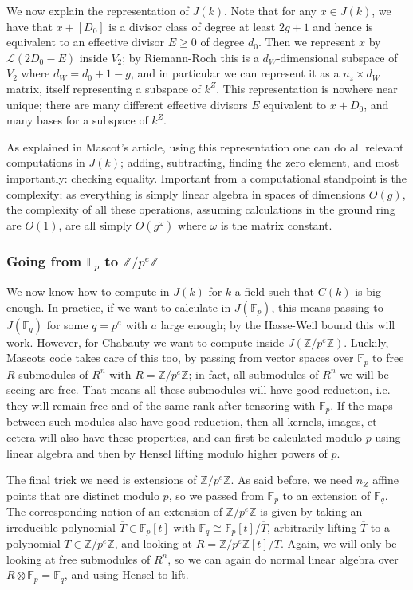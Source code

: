 \documentclass[12pt]{article}
\newcommand{\Z}{\mathbb{Z}}
\newcommand{\Lcal}{\mathcal{L}}
\newcommand{\F}{\mathbb{F}}
\newcommand{\tensor}{\otimes}
\theoremstyle{plain}
\theoremstyle{definition}
\theoremstyle{remark}
\begin{document}
We now explain the representation of $J(k)$. Note that for any $x \in J(k)$, we have that $x + [D_0]$ is a divisor class of degree at least $2g+1$ and hence is equivalent to an effective divisor $E \geq 0$ of degree $d_0$. Then we represent $x$ by $\Lcal(2D_0 - E)$ inside $V_2$; by Riemann-Roch this is a $d_W$-dimensional subspace of $V_2$ where $d_W = d_0 + 1 - g$, and in particular we can represent it as a $n_z \times d_W$ matrix, itself representing a subspace of $k^Z$. This representation is nowhere near unique; there are many different effective divisors $E$ equivalent to $x + D_0$, and many bases for a subspace of $k^Z$.

As explained in Mascot's article, using this representation one can do all relevant computations in $J(k)$; adding, subtracting, finding the zero element, and most importantly: checking equality. Important from a computational standpoint is the complexity; as everything is simply linear algebra in spaces of dimensions $O(g)$, the complexity of all these operations, assuming calculations in the ground ring are $O(1)$, are all simply $O(g^\omega)$ where $\omega$ is the matrix constant.

\subsubsection{Going from \texorpdfstring{$\F_p$}{Fp} to \texorpdfstring{$\Z/p^e\Z$}{Z/peZ}}
We now know how to compute in $J(k)$ for $k$ a field such that $C(k)$ is big enough. In practice, if we want to calculate in $J(\F_p)$, this means passing to $J(\F_q)$ for some $q = p^a$ with $a$ large enough; by the Hasse-Weil bound this will work. However, for Chabauty we want to compute inside $J(\Z/p^e\Z)$. Luckily, Mascots code takes care of this too, by passing from vector spaces over $\F_p$ to free $R$-submodules of $R^n$ with $R = \Z/p^e\Z$; in fact, all submodules of $R^n$ we will be seeing are free. That means all these submodules will have good reduction, i.e. they will remain free and of the same rank after tensoring with $\F_p$. If the maps between such modules also have good reduction, then all kernels, images, et cetera will also have these properties, and can first be calculated modulo $p$ using linear algebra and then by Hensel lifting modulo higher powers of $p$.

The final trick we need is extensions of $\Z/p^e\Z$. As said before, we need $n_Z$ affine points that are distinct modulo $p$, so we passed from $\F_p$ to an extension of $\F_q$. The corresponding notion of an extension of $\Z/p^e\Z$ is given by taking an irreducible polynomial $\overline{T} \in \F_p[t]$ with $\F_q \cong \F_p[t]/\overline{T}$, arbitrarily lifting $\overline{T}$ to a polynomial $T \in \Z/p^e\Z$, and looking at $R = \Z/p^e\Z[t]/T$. Again, we will only be looking at free submodules of $R^n$, so we can again do normal linear algebra over $R \tensor \F_p = \F_q$, and using Hensel to lift.
\end{document}
